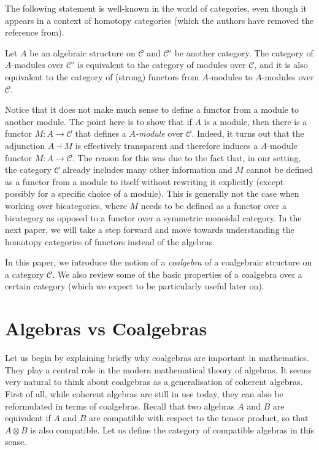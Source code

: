 \documentclass[a4paper,reqno,oneside]{article}
\begin{document}
The following statement is well-known in the world of categories, even though it appears in a context of homotopy categories (which the authors have removed the reference from).

\begin{corollary}
    Let $A$ be an algebraic structure on $\mathcal{C}$ and $\mathcal{C}'$ be another category. The category of $A$-modules over $\mathcal{C}'$ is equivalent to the category of modules over $\mathcal{C}$, and it is also equivalent to the category of (strong) functors from $A$-modules to $A$-modules over $\mathcal{C}$.
\end{corollary}

\begin{remark}
    Notice that it does not make much sense to define a functor from a module to another module. The point here is to show that if $A$ is a module, then there is a functor $M: A \to \mathcal{C}$ that defines a \textit{$A$-module} over $\mathcal{C}$. Indeed, it turns out that the adjunction $A \dashv M$ is effectively transparent and therefore induces a $A$-module functor $M: A \to \mathcal{C}$. The reason for this was due to the fact that, in our setting, the category $\mathcal{C}$ already includes many other information and $M$ cannot be defined as a functor from a module to itself without rewriting it explicitly (except possibly for a specific choice of a module). This is generally not the case when working over bicategories, where $M$ needs to be defined as a functor over a bicategory as opposed to a functor over a symmetric monoidal category. In the next paper, we will take a step forward and move towards understanding the homotopy categories of functors instead of the algebras. 
\end{remark}

In this paper, we introduce the notion of a \textit{coalgebra} of a coalgebraic structure on a category $\mathcal{C}$. We also review some of the basic properties of a coalgebra over a certain category (which we expect to be particularly useful later on).


\section{Algebras vs Coalgebras}

Let us begin by explaining briefly why coalgebras are important in mathematics. They play a central role in the modern mathematical theory of algebras. It seems very natural to think about coalgebras as a generalisation of coherent algebras. First of all, while coherent algebras are still in use today, they can also be reformulated in terms of coalgebras. Recall that two algebras $A$ and $B$ are equivalent if $A$ and $B$ are compatible with respect to the tensor product, so that $A \otimes B$ is also compatible. Let us define the category of compatible algebras in this sense.
\end{document}
